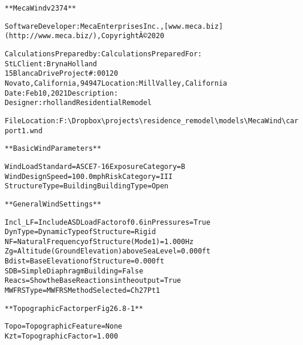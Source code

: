\documentclass[12pt,notitle,letterpaper]{report}
\renewenvironment{quote}
  {\small\list{}{\rightmargin=0cm \leftmargin=0cm}%
   \item\relax}
  {\endlist}
\begin{document}
\begin{quote}
\begin{alltt}
**MecaWind v2374**

    Software Developer: Meca Enterprises Inc., [www.meca.biz](http://www.meca.biz/), Copyright Â© 2020



    Calculations Prepared by:                    Calculations Prepared For:
    StL                                           Client:      Bryna Holland
    15 Blanca Drive                               Project #:           00120
    Novato, California, 94947                     Location:    Mill Valley, California
    Date: Feb 10, 2021                            Description:
    Designer: rholland                            Residential Remodel



    File Location : F:\textbackslash{}Dropbox\textbackslash{}projects\textbackslash{}residence_remodel\textbackslash{}models\textbackslash{}MecaWind\textbackslash{}carport1.wnd



**Basic Wind Parameters**

    Wind Load Standard           = ASCE 7-16       Exposure Category            = B
    Wind Design Speed            = 100.0 mph       Risk Category                = III
    Structure Type               = Building        Building Type                = Open



**General Wind Settings**

    Incl_LF   = Include ASD Load Factor of 0.6 in Pressures                     = True
    DynType   = Dynamic Type of Structure                                       = Rigid
    NF        = Natural Frequency of Structure (Mode 1)                         = 1.000 Hz
    Zg        = Altitude (Ground Elevation) above Sea Level                     = 0.000 ft
    Bdist     = Base Elevation of Structure                                     = 0.000 ft
    SDB       = Simple Diaphragm Building                                       = False
    Reacs     = Show the Base Reactions in the output                           = True
    MWFRSType = MWFRS Method Selected                                           = Ch 27 Pt 1



**Topographic Factor per Fig 26.8-1**

    Topo      = Topographic Feature                                             = None
    Kzt       = Topographic Factor                                              = 1.000




\end{alltt}
\end{quote}
\end{document}
